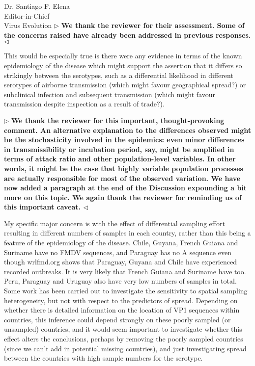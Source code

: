 \documentclass[12pt, a4paper]{letter} %
\newenvironment{reply}{$\triangleright$\bf}{$\triangleleft$}
\begin{document}
\begin{letter}{
	Dr. Santiago F. Elena\\
    Editor-in-Chief \\
    Virus Evolution
}
\begin{reply}
We thank the reviewer for their assessment.
Some of the concerns raised have already been addressed in previous responses.
\end{reply}

This would be especially true is there were any evidence in terms of the known epidemiology of the disease which might support the assertion that it differs so strikingly between the serotypes, such as a differential likelihood in different serotypes of airborne transmission (which might favour geographical spread?) or subclinical infection and subsequent transmission (which might favour transmission despite inspection as a result of trade?).

\begin{reply}
We thank the reviewer for this important, thought-provoking comment.
An alternative explanation to the differences observed might be the stochasticity involved in the epidemics: even minor differences in transmissibility or incubation period, say, might be amplified in terms of attack ratio and other population-level variables.
In other words, it might be the case that highly variable population processes are actually responsible for most of the observed variation.
We have now added a paragraph at the end of the Discussion expounding a bit more on this topic.
We again thank the reviewer for reminding us of this important caveat.
\end{reply}

My specific major concern is with the effect of differential sampling effort resulting in different numbers of samples in each country, rather than this being a feature of the epidemiology of the disease. 
Chile, Guyana, French Guiana and Suriname have no FMDV sequences, and Paraguay has no A sequence even though wrlfmd.org shows that Paraguay, Guyana and Chile have experienced recorded outbreaks. 
It is very likely that French Guiana and Suriname have too. 
Peru, Paraguay and Uruguay also have very low numbers of samples in total. Some work has been carried out to investigate the sensitivity to spatial sampling heterogeneity, but not with respect to the predictors of spread. 
Depending on whether there is detailed information on the location of VP1 sequences within countries, this inference could depend strongly on these poorly sampled (or unsampled) countries, and it would seem important to investigate whether this effect alters the conclusions, perhaps by removing the poorly sampled countries (since we can't add in potential missing countries), and just investigating spread between the countries with high sample numbers for the serotype.


\end{letter}
\end{document}
